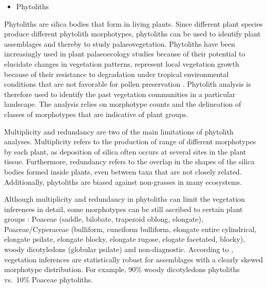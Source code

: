 \documentclass[
  12pt,
]{book}
\providecommand{\tightlist}{%
  \setlength{\itemsep}{0pt}\setlength{\parskip}{0pt}}
\begin{document}
\begin{itemize}
\tightlist
\item
  Phytoliths
\end{itemize}

Phytoliths are silica bodies that form in living plants. Since different plant species produce different phytolith morphotypes, phytoliths can be used to identify plant assemblages and thereby to study palaeovegetation. Phytoliths have been increasingly used in plant palaeoecology studies because of their potential to elucidate changes in vegetation patterns, represent local vegetation growth because of their resistance to degradation under tropical environmental conditions that are not favorable for pollen preservation \citep{rashidPhytolithsProxies2019, testePhytolithsNaachtunPeten2020}. Phytolith analysis is therefore used to identify the past vegetation communities in a particular landscape. The analysis relies on morphotype counts and the delineation of classes of morphotypes that are indicative of plant groups.

Multiplicity and redundancy are two of the main limitations of phytolith analyses. Multiplicity refers to the production of range of different morphotypes by each plant, as deposition of silica often occurs at several sites in the plant tissue. Furthermore, redundancy refers to the overlap in the shapes of the silica bodies formed inside plants, even between taxa that are not closely related. Additionally, phytoliths are biased against non-grasses in many ecosystems.

Although multiplicity and redundancy in phytoliths can limit the vegetation inferences in detail, some morphotypes can be still ascribed to certain plant groups \citep{neumannInternationalCodePhytolith2019, daniauTerrestrialPlantMicrofossils2019}: Poaceae (saddle, bilobate, trapezoid oblong, elongate), Poaceae/Cyperaceae (bulliform, cuneiform bulliform, elongate entire cylindrical, elongate psilate, elongate blocky, elongate rugose, elogate facetated, blocky), woody dicotyledons (globular psilate) and non-diagnostic. According to \citet{strombergPhytolithsPaleoecologyAnalytical2018}, vegetation inferences are statistically robust for assemblages with a clearly skewed morphotype distribution. For example, 90\% woody dicotyledons phytoliths vs.~10\% Poaceae phytoliths.
\end{document}
